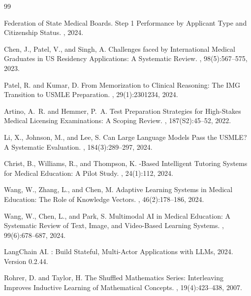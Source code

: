 \documentclass[10pt]{article}
\begin{document}
\begin{thebibliography}{99}

Federation of State Medical Boards.
 Step 1 Performance by Applicant Type and Citizenship Status.
, 2024.

Chen, J., Patel, V., and Singh, A.
\newblock Challenges faced by International Medical Graduates in {US} Residency Applications: A Systematic Review.
, 98(5):567--575, 2023.

Patel, R. and Kumar, D.
\newblock From Memorization to Clinical Reasoning: The {IMG} Transition to {USMLE} Preparation.
, 29(1):2301234, 2024.

Artino, A.~R. and Hemmer, P.~A.
\newblock Test Preparation Strategies for High-Stakes Medical Licensing Examinations: A Scoping Review.
, 187(S2):45--52, 2022.

Li, X., Johnson, M., and Lee, S.
\newblock Can Large Language Models Pass the {USMLE}? A Systematic Evaluation.
, 184(3):289--297, 2024.

Christ, B., Williams, R., and Thompson, K.
-Based Intelligent Tutoring Systems for Medical Education: A Pilot Study.
, 24(1):112, 2024.

Wang, W., Zhang, L., and Chen, M.
\newblock Adaptive Learning Systems in Medical Education: The Role of Knowledge Vectors.
, 46(2):178--186, 2024.

Wang, W., Chen, L., and Park, S.
\newblock Multimodal {AI} in Medical Education: A Systematic Review of Text, Image, and Video-Based Learning Systems.
, 99(6):678--687, 2024.

LangChain AI.
: Build Stateful, Multi-Actor Applications with {LLMs}, 2024.
\newblock Version 0.2.44.

Rohrer, D. and Taylor, H.
\newblock The Shuffled Mathematics Series: Interleaving Improves Inductive Learning of Mathematical Concepts.
, 19(4):423--438, 2007.


\end{thebibliography}
\end{document}
